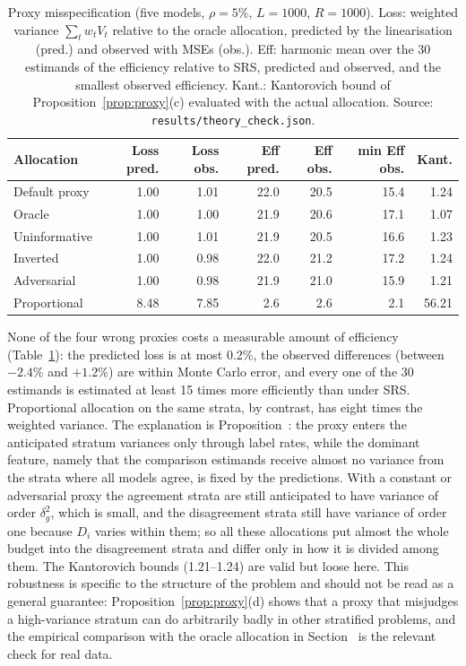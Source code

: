 \begin{table}[t]
\centering
\caption{Proxy misspecification (five models, $\rho=5\%$, $L=1000$, $R=1000$). Loss: weighted
variance $\sum_tw_tV_t$ relative to the oracle allocation, predicted by the linearisation (pred.) and
observed with MSEs (obs.). Eff: harmonic mean over the 30 estimands of the efficiency relative to
SRS, predicted and observed, and the smallest observed efficiency. Kant.: Kantorovich bound of
Proposition~\ref{prop:proxy}(c) evaluated with the actual allocation. Source:
\texttt{results/theory\_check.json}.}
\label{tab:sim-proxy}
\small
\begin{tabular}{lrrrrrr}
\toprule
Allocation & Loss pred. & Loss obs. & Eff pred. & Eff obs. & min Eff obs. & Kant.\\
\midrule
Default proxy & 1.00 & 1.01 & 22.0 & 20.5 & 15.4 & 1.24\\
Oracle & 1.00 & 1.00 & 21.9 & 20.6 & 17.1 & 1.07\\
Uninformative & 1.00 & 1.01 & 21.9 & 20.5 & 16.6 & 1.23\\
Inverted & 1.00 & 0.98 & 22.0 & 21.2 & 17.2 & 1.24\\
Adversarial & 1.00 & 0.98 & 21.9 & 21.0 & 15.9 & 1.21\\
Proportional & 8.48 & 7.85 & 2.6 & 2.6 & 2.1 & 56.21\\
\bottomrule
\end{tabular}
\end{table}

None of the four wrong proxies costs a measurable amount of efficiency (Table~\ref{tab:sim-proxy}):
the predicted loss is at most 0.2\%, the observed differences (between $-2.4\%$ and $+1.2\%$) are
within Monte Carlo error, and every one of the 30 estimands is estimated at least 15 times more
efficiently than under SRS. Proportional allocation on the same strata, by contrast, has eight times
the weighted variance. The explanation is Proposition~: the proxy enters the
anticipated stratum variances only through label rates, while the dominant feature, namely that the
comparison estimands receive almost no variance from the strata where all models agree, is fixed by
the predictions. With a constant or adversarial proxy the agreement strata are still anticipated to
have variance of order $\delta_g^2$, which is small, and the disagreement strata still have variance
of order one because $D_i$ varies within them; so all these allocations put almost the whole budget
into the disagreement strata and differ only in how it is divided among them. The Kantorovich bounds
(1.21--1.24) are valid but loose here. This robustness is specific to the structure of the problem
and should not be read as a general guarantee: Proposition~\ref{prop:proxy}(d) shows that a proxy
that misjudges a high-variance stratum can do arbitrarily badly in other stratified problems, and the
empirical comparison with the oracle allocation in Section~ is the relevant check
for real data.

